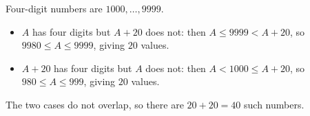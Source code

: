 Four-digit numbers are $1000,\dots,9999$.
\begin{itemize}
\item $A$ has four digits but $A+20$ does not: then $A\le9999<A+20$, so $9980\le A\le9999$, giving $20$ values.
\item $A+20$ has four digits but $A$ does not: then $A<1000\le A+20$, so $980\le A\le999$, giving $20$ values.
\end{itemize}
The two cases do not overlap, so there are $20+20=\boxed{40}$ such numbers.
